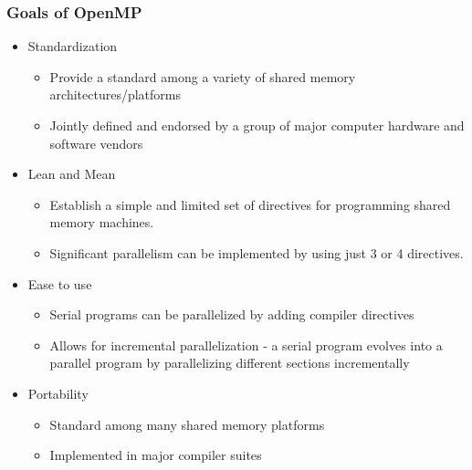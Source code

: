 \documentclass[10pt,t]{beamer}
\begin{document}
\begin{frame}
  \frametitle{Goals of OpenMP}
  \vspace{-0.5cm}
  \begin{block}{}
    \begin{itemize}
      \item Standardization
        \begin{itemize}
        \item Provide a standard among a variety of shared memory architectures/platforms
        \item Jointly defined and endorsed by a group of major computer hardware and software vendors
        \end{itemize}
      \item Lean and Mean
        \begin{itemize}
        \item Establish a simple and limited set of directives for programming shared memory machines.
        \item Significant parallelism can be implemented by using just 3 or 4 directives.
        \end{itemize}
      \item Ease to use 
      \begin{itemize}
        \item Serial programs can be parallelized by adding compiler directives
        \item Allows for incremental parallelization - a serial program evolves into a parallel program by parallelizing different sections incrementally
      \end{itemize}
      \item Portability
      \begin{itemize}
        \item Standard among many shared memory platforms
        \item Implemented in major compiler suites
      \end{itemize}
    \end{itemize}
  \end{block}
\end{frame}
\end{document}
